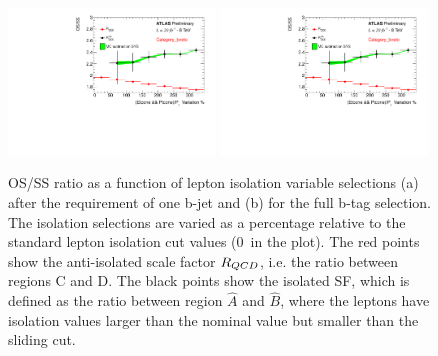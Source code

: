\begin{figure}[h!]
\begin{center}
\includegraphics[page=3, width=0.49\textwidth]{figure/QCD/qcd_plot.pdf}
\includegraphics[page=4, width=0.49\textwidth]{figure/QCD/qcd_plot.pdf}
\end{center}
	\caption{OS/SS ratio as a function of lepton isolation variable selections (a) after the requirement of one b-jet and (b) for the full b-tag selection. The isolation selections are varied as a percentage relative to
	the standard lepton isolation cut values (0~in the plot). 
	The red points show the anti-isolated scale factor $R_{QCD}$, i.e. the ratio between regions C and D.
	 The black points show the isolated SF, which is defined as the ratio between region $\hat{A}$ and $\hat{B}$, 
	 where the leptons have isolation values larger than the nominal value but smaller
	 than the sliding cut.
	 }
\end{figure}

\clearpage
